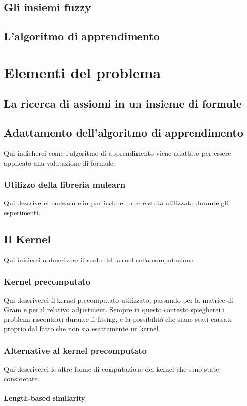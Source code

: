\documentclass[12pt,a4paper]{report}
\begin{document}
\section{Gli insiemi fuzzy}
\section{L'algoritmo di apprendimento}

\chapter{Elementi del problema}

\section{La ricerca di assiomi in un insieme di formule}
\section{Adattamento dell'algoritmo di apprendimento}
Qui indicherei come l'algoritmo di apprendimento viene adattato per essere applicato alla valutazione di formule.
\subsection{Utilizzo della libreria mulearn}
Qui descriverei mulearn e in particolare come è stata utilizzata durante gli esperimenti.
\section{Il Kernel}
Qui inizierei a descrivere il ruolo del kernel nella computazione.
\subsection{Kernel precomputato}
Qui descriverei il kernel precomputato utilizzato, passando per la matrice di Gram e per il relativo adjustment. Sempre in questo contesto spiegherei i problemi riscontrati durante il fitting, e la possibilità che siano stati causati proprio dal fatto che non sia esattamente un kernel.
\subsection{Alternative al kernel precomputato}
Qui descriverei le altre forme di computazione del kernel che sono state considerate.
\subsubsection{Length-based similarity}
\end{document}
